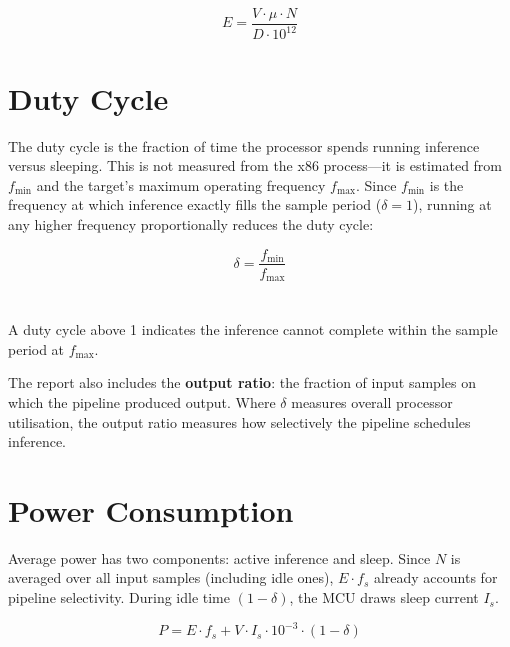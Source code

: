 \documentclass[12pt]{article}
\newcommand{\bigformula}[1]{{\Large \begin{equation} #1 \end{equation}}}
\begin{document}
\bigformula{E = \frac{V \cdot \mu \cdot N}{D \cdot 10^{12}}}

\section{Duty Cycle}

The duty cycle is the fraction of time the processor spends running inference versus sleeping. This is not measured from the x86 process---it is estimated from $f_{\min}$ and the target's maximum operating frequency $f_{\max}$. Since $f_{\min}$ is the frequency at which inference exactly fills the sample period ($\delta = 1$), running at any higher frequency proportionally reduces the duty cycle:

\bigformula{\delta = \frac{f_{\min}}{f_{\max}}}
\\
\\
A duty cycle above 1 indicates the inference cannot complete within the sample period at $f_{\max}$.

The report also includes the \textbf{output ratio}: the fraction of input samples on which the pipeline produced output. Where $\delta$ measures overall processor utilisation, the output ratio measures how selectively the pipeline schedules inference.

\section{Power Consumption}

Average power has two components: active inference and sleep. Since $N$ is averaged over all input samples (including idle ones), $E \cdot f_s$ already accounts for pipeline selectivity. During idle time $(1 - \delta)$, the MCU draws sleep current $I_s$.

\bigformula{P = E \cdot f_s + V \cdot I_s \cdot 10^{-3} \cdot (1 - \delta)}
\end{document}
